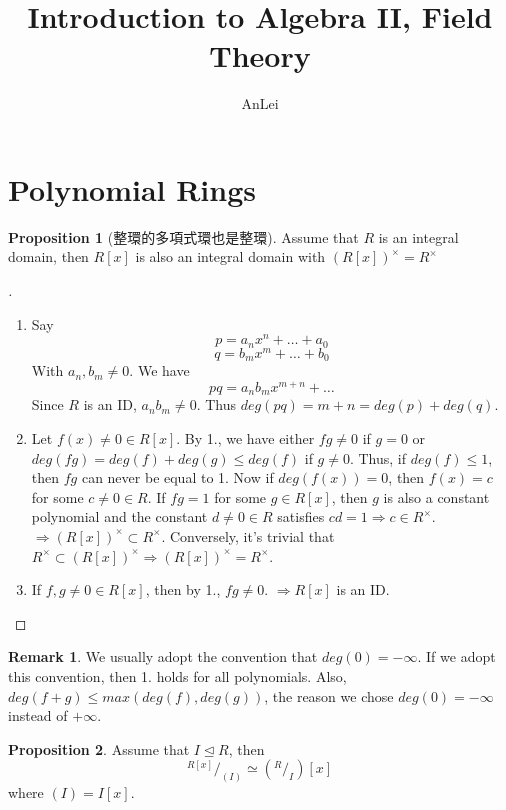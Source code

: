 \documentclass[12pt]{article}
\title{Introduction to Algebra II, Field Theory}
\author{AnLei}
\date{ }
\theoremstyle{definition}
\newtheorem{rem}{Remark}
\newtheorem{prop}{Proposition}
\newenvironment{proofs}[1][\proofname]{%
  \begin{proof}[#1]$ $\par\nobreak\ignorespaces
}{%
  \end{proof}
}
\newcommand*\quot[2]{{^{\textstyle #1}\big/_{\textstyle #2}}}
\begin{document}
\maketitle
\tableofcontents

\section{Polynomial Rings}

\begin{prop}[整環的多項式環也是整環]
	Assume that $R$ is an integral domain, then $R[x]$ is also an integral domain with $(R[x])^\times=R^\times$
\end{prop}


\begin{proofs}
	\begin{enumerate}
		\item Say
		      $$p = a_n x^n + \hdots + a_0$$
		      $$q = b_m x^m + \hdots + b_0$$
		      With $a_n, b_m \neq 0$. We have
		      $$pq = a_n b_m x^{m + n} + \hdots$$
		      Since $R$ is an ID, $a_n b_m \neq 0$. Thus $deg(pq) = m + n  = deg(p) + deg(q)$.
		\item Let $f(x) \neq 0 \in R[x]$. By 1., we have either $fg \neq 0$ if $g = 0$ or $deg(fg) = deg(f) + deg(g) \leq deg(f)$ if $g \neq 0$. Thus, if $deg(f) \leq 1$, then $fg$ can never be equal to 1. Now if $deg(f(x)) = 0$, then $f(x) = c$ for some $c \neq 0 \in R$. If $fg = 1$ for some $g \in R[x]$, then $g$ is also a constant polynomial and the constant $d \neq 0 \in R$ satisfies $cd = 1 \Rightarrow c \in R^\times$. $\Rightarrow (R[x])^\times \subset R^\times$. Conversely, it's trivial that $R^\times \subset (R[x])^\times \Rightarrow (R[x])^\times = R^\times$.
		\item If $f, g \neq 0 \in R[x]$, then by 1., $fg \neq 0$. $\Rightarrow R[x]$ is an ID.
	\end{enumerate}
\end{proofs}


\begin{rem}
	We usually adopt the convention that $deg(0) = - \infty$. If we adopt this convention, then 1. holds for all polynomials. Also, $deg(f + g) \leq max(deg(f), deg(g))$, the reason we chose $deg(0) = - \infty$ instead of $+ \infty$.
\end{rem}

\begin{prop}
	Assume that $I \trianglelefteq R$, then
	$$\quot{R[x]}{(I)} \simeq (\quot{R}{I})[x]$$
	where $(I) = I[x]$.
\end{prop}
\end{document}
